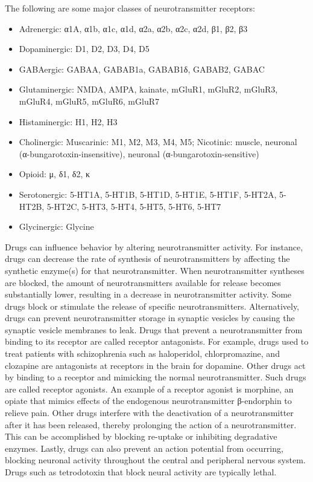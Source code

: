 The following are some major classes of neurotransmitter receptors:

\begin{itemize}
\tightlist
\item
  Adrenergic: α1A, α1b, α1c, α1d, α2a, α2b, α2c, α2d, β1, β2, β3
\item
  Dopaminergic: D1, D2, D3, D4, D5
\item
  GABAergic: GABAA, GABAB1a, GABAB1δ, GABAB2, GABAC
\item
  Glutaminergic: NMDA, AMPA, kainate, mGluR1, mGluR2, mGluR3, mGluR4, mGluR5, mGluR6, mGluR7
\item
  Histaminergic: H1, H2, H3
\item
  Cholinergic: Muscarinic: M1, M2, M3, M4, M5; Nicotinic: muscle, neuronal (α-bungarotoxin-insensitive), neuronal (α-bungarotoxin-sensitive)
\item
  Opioid: μ, δ1, δ2, κ
\item
  Serotonergic: 5-HT1A, 5-HT1B, 5-HT1D, 5-HT1E, 5-HT1F, 5-HT2A, 5-HT2B, 5-HT2C, 5-HT3, 5-HT4, 5-HT5, 5-HT6, 5-HT7
\item
  Glycinergic: Glycine
\end{itemize}

Drugs can influence behavior by altering neurotransmitter activity. For instance, drugs can decrease the rate of synthesis of neurotransmitters by affecting the synthetic enzyme(s) for that neurotransmitter. When neurotransmitter syntheses are blocked, the amount of neurotransmitters available for release becomes substantially lower, resulting in a decrease in neurotransmitter activity. Some drugs block or stimulate the release of specific neurotransmitters. Alternatively, drugs can prevent neurotransmitter storage in synaptic vesicles by causing the synaptic vesicle membranes to leak. Drugs that prevent a neurotransmitter from binding to its receptor are called receptor antagonists. For example, drugs used to treat patients with schizophrenia such as haloperidol, chlorpromazine, and clozapine are antagonists at receptors in the brain for dopamine. Other drugs act by binding to a receptor and mimicking the normal neurotransmitter. Such drugs are called receptor agonists. An example of a receptor agonist is morphine, an opiate that mimics effects of the endogenous neurotransmitter β-endorphin to relieve pain. Other drugs interfere with the deactivation of a neurotransmitter after it has been released, thereby prolonging the action of a neurotransmitter. This can be accomplished by blocking re-uptake or inhibiting degradative enzymes. Lastly, drugs can also prevent an action potential from occurring, blocking neuronal activity throughout the central and peripheral nervous system. Drugs such as tetrodotoxin that block neural activity are typically lethal.

